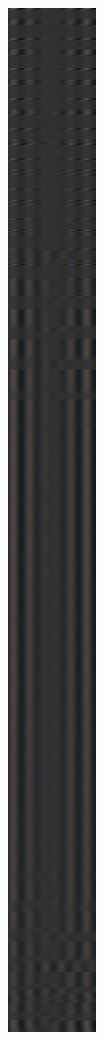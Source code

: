  \begin{figure}[!h]
\centering
\begin{subfigure}{.4\textwidth}
  \centering
  \includegraphics[scale=0.1]{img/eulerian/sample/tempp2}

\end{subfigure}
\end{figure}
